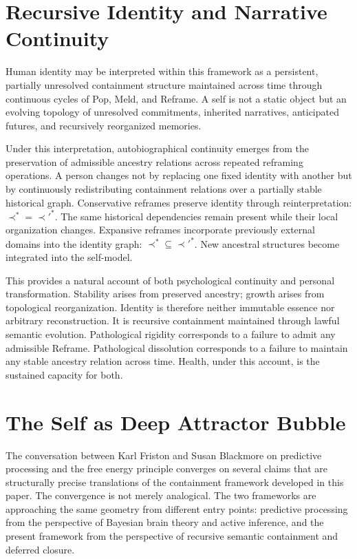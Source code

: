 \documentclass[12pt, a4paper]{article}
\theoremstyle{plain}
\theoremstyle{definition}
\theoremstyle{remark}
\begin{document}
\section{Recursive Identity and Narrative Continuity}

Human identity may be interpreted within this framework as a persistent,
partially unresolved containment structure maintained across time through
continuous cycles of Pop, Meld, and Reframe. A self is not a static object
but an evolving topology of unresolved commitments, inherited narratives,
anticipated futures, and recursively reorganized memories.

Under this interpretation, autobiographical continuity emerges from the
preservation of admissible ancestry relations across repeated reframing
operations. A person changes not by replacing one fixed identity with another
but by continuously redistributing containment relations over a partially
stable historical graph. Conservative reframes preserve identity through
reinterpretation: $\prec^* = \prec'^*$. The same historical dependencies
remain present while their local organization changes. Expansive reframes
incorporate previously external domains into the identity graph:
$\prec^* \subseteq \prec'^*$. New ancestral structures become integrated into
the self-model.

This provides a natural account of both psychological continuity and personal
transformation. Stability arises from preserved ancestry; growth arises from
topological reorganization. Identity is therefore neither immutable essence
nor arbitrary reconstruction. It is recursive containment maintained through
lawful semantic evolution. Pathological rigidity corresponds to a failure to
admit any admissible Reframe. Pathological dissolution corresponds to a
failure to maintain any stable ancestry relation across time. Health, under
this account, is the sustained capacity for both.


\section{The Self as Deep Attractor Bubble}

The conversation between Karl Friston and Susan Blackmore on predictive
processing and the free energy principle \cite{Friston2023} converges on several claims that are
structurally precise translations of the containment framework developed in
this paper. The convergence is not merely analogical. The two frameworks are
approaching the same geometry from different entry points: predictive processing
from the perspective of Bayesian brain theory and active inference, and the
present framework from the perspective of recursive semantic containment and
deferred closure.
\end{document}
